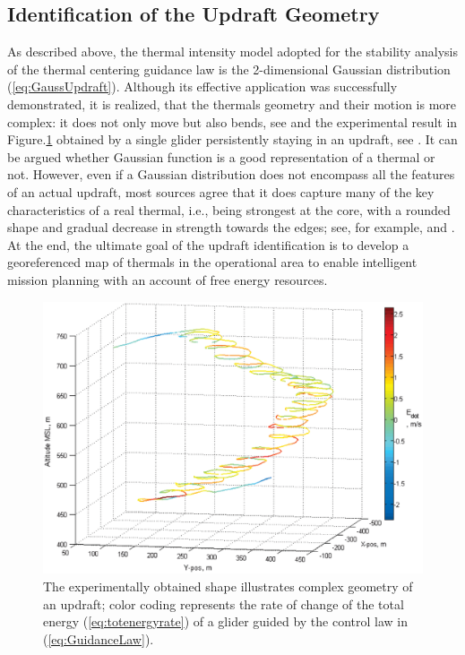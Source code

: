 \documentclass{ifacconf}
\begin{document}
\subsection{Identification of the Updraft Geometry}
\label{subsec:UpdraftID}
As described above, the thermal intensity model adopted for the stability analysis of the thermal centering guidance law is the 2-dimensional Gaussian distribution (\ref{eq:GaussUpdraft}). Although its effective application was successfully demonstrated, it is realized, that the thermals geometry and their motion is more complex: it does not only move but also bends, see \cite{Reichmann:1978} and the experimental result in  Figure.\ref{fig:ThermaShape} obtained by a single glider persistently staying in an updraft, see \cite{AKlass_JGCD:2012}.  It can be argued whether Gaussian function is a good representation of a thermal or not. However, even if a Gaussian distribution does not encompass all the features of an actual updraft, most sources agree that it does capture many of the key characteristics of a real thermal, i.e., being strongest at the core, with a rounded shape and gradual decrease in strength towards the edges; see, for example, \cite{Wharington:1998} and \cite{Pagen:1992}. At the end, the ultimate goal of the updraft identification is to develop a georeferenced map of thermals in the operational area to enable intelligent mission planning with an account of free energy resources.

\begin{figure}[thpb]
  \centering
  \includegraphics[scale=0.3]{Figures/BendedThermal.eps}
  \caption{The experimentally obtained shape illustrates complex geometry of an updraft; color coding represents the rate of change of the total energy (\ref{eq:totenergyrate}) of a glider guided by the control law in (\ref{eq:GuidanceLaw}).}
  \label{fig:ThermaShape}
\end{figure}
\end{document}
